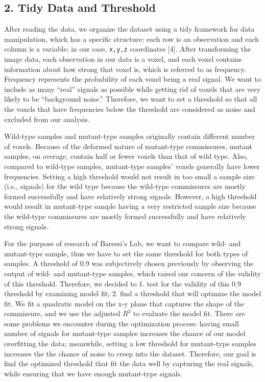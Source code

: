 \documentclass[10pt,letterpaper]{article}
\begin{document}
\hypertarget{tidy-data-and-threshold}{%
\subsection{2. Tidy Data and Threshold}\label{tidy-data-and-threshold}}

After reading the data, we organize the dataset using a tidy framework
for data manipulation, which has a specific structure: each row is an
observation and each column is a variable; in our case, \texttt{x,y,z}
coordinates {[}4{]}. After transforming the image data, each observation
in our data is a voxel, and each voxel contains information about how
strong that voxel is, which is referred to as frequency. Frequency
represents the probability of each voxel being a real signal. We want to
include as many ``real'' signals as possible while getting rid of voxels
that are very likely to be ``background noise.'' Therefore, we want to
set a threshold so that all the voxels that have frequencies below the
threshold are considered as noise and excluded from our analysis.

Wild-type samples and mutant-type samples originally contain different
number of voxels. Because of the deformed nature of mutant-type
commissures, mutant samples, on average, contain half or fewer voxels
than that of wild type. Also, compared to wild-type samples, mutant-type
samples' voxels generally have lower frequencies. Setting a high
threshold would not result in too small a sample size (i.e., signals)
for the wild type because the wild-type commissures are mostly formed
successfully and have relatively strong signals. However, a high
threshold would result in mutant-type sample having a very restricted
sample size because the wild-type commissures are mostly formed
successfully and have relatively strong signals.

For the purpose of research of Baressi's Lab, we want to compare wild-
and mutant-type sample, thus we have to set the same threshold for both
types of samples. A threshold of 0.9 was subjectively chosen previously
by observing the output of wild- and mutant-type samples, which raised
our concern of the validity of this threshold. Therefore, we decided to
1. test for the validity of this 0.9 threshold by examining model fit;
2. find a threshold that will optimize the model fit. We fit a quadratic
model on the x-y plane that captures the shape of the commissure, and we
use the adjusted \(R^2\) to evaluate the model fit. There are some
problems we encounter during the optimization process: having small
number of signals for mutant-type samples increases the chance of our
model overfitting the data; meanwhile, setting a low threshold for
mutant-type samples increases the the chance of noise to creep into the
dataset. Therefore, our goal is find the optimized threshold that fit
the data well by capturing the real signals, while ensuring that we have
enough mutant-type signals.
\end{document}
